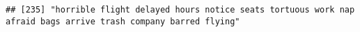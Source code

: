 \documentclass[
]{article}
\begin{document}
\begin{verbatim}
## [235] "horrible flight delayed hours notice seats tortuous work nap afraid bags arrive trash company barred flying"                                                                                                                                                                                                                                                                                                                                                                                                                                                                                                                                                                                                                                                                                                                                                                                                                                                                                                                                                                                                                                                                                                                                                                                                                                                                                                                                                                                                                                                                                                                                                                                                                                                                                   

\end{verbatim}
\end{document}
